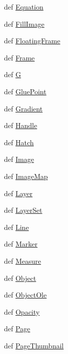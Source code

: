 \begin{DoxyCompactItemize}
\item 
def \hyperlink{namespaceodf_1_1draw_a8019aee1cf8638aaf8e058495224e18b}{Equation}
\item 
def \hyperlink{namespaceodf_1_1draw_a7820347b2c8c35512386f5e492cedfcd}{Fill\+Image}
\item 
def \hyperlink{namespaceodf_1_1draw_a42143f3cd61ca255070b76aa0d8a60a3}{Floating\+Frame}
\item 
def \hyperlink{namespaceodf_1_1draw_a6982db25567ebf0e29f1c37e1b407908}{Frame}
\item 
def \hyperlink{namespaceodf_1_1draw_ad2abf6ab0b81e09da0eb0c06c2306f7c}{G}
\item 
def \hyperlink{namespaceodf_1_1draw_a999d7da1ea0a91f20d4128e2ac523932}{Glue\+Point}
\item 
def \hyperlink{namespaceodf_1_1draw_ac59308ebd82c72f4dc098358f6dcee3d}{Gradient}
\item 
def \hyperlink{namespaceodf_1_1draw_a569e0a30f3f44d4fc719813301a038c5}{Handle}
\item 
def \hyperlink{namespaceodf_1_1draw_a6732a23a2cfbdc0f8b06c9b14c9926c1}{Hatch}
\item 
def \hyperlink{namespaceodf_1_1draw_a61b6b6a5bb6eda79ec00a4efa1c982f0}{Image}
\item 
def \hyperlink{namespaceodf_1_1draw_a0c1d56af25f232e8b0011e0bf823fa85}{Image\+Map}
\item 
def \hyperlink{namespaceodf_1_1draw_aae9eb5ae46e536c8800b5b18a7868b19}{Layer}
\item 
def \hyperlink{namespaceodf_1_1draw_aad2a0699ae7b759c24ab1c6a25b835a7}{Layer\+Set}
\item 
def \hyperlink{namespaceodf_1_1draw_abdd7c40b2d4504744fb37e12ee393d68}{Line}
\item 
def \hyperlink{namespaceodf_1_1draw_ae9494b54e945c5cfe9dd175d89cf4b4a}{Marker}
\item 
def \hyperlink{namespaceodf_1_1draw_aaeed001f3e9662b4f06fbf1f01a120e2}{Measure}
\item 
def \hyperlink{namespaceodf_1_1draw_a522a026426f3bad7e74e09f82b3ab770}{Object}
\item 
def \hyperlink{namespaceodf_1_1draw_ac670ba8a406d2bfe044b810c0adcf1cb}{Object\+Ole}
\item 
def \hyperlink{namespaceodf_1_1draw_a398ffbd306f5b6f16b846356ffa7066e}{Opacity}
\item 
def \hyperlink{namespaceodf_1_1draw_a2cec76f7cbd3acbca5c5eba5290e5754}{Page}
\item 
def \hyperlink{namespaceodf_1_1draw_a15b1916f99b043836a0a9a2f89aac3cf}{Page\+Thumbnail}

\end{DoxyCompactItemize}
